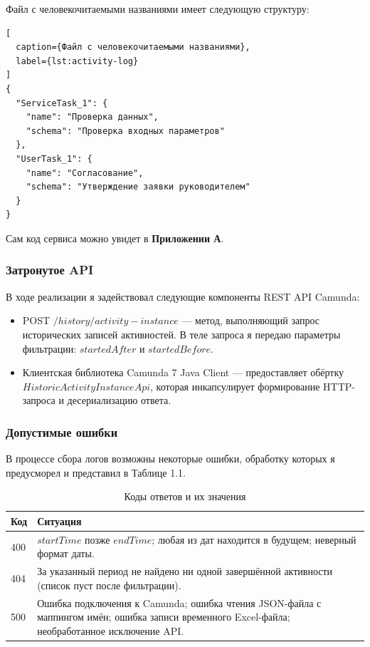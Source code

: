 Файл с человекочитаемыми названиями имеет следующую структуру:

\begin{lstlisting}[
  caption={Файл с человекочитаемыми названиями},
  label={lst:activity-log}
]
{
  "ServiceTask_1": {
    "name": "Проверка данных",
    "schema": "Проверка входных параметров"
  },
  "UserTask_1": {
    "name": "Согласование",
    "schema": "Утверждение заявки руководителем"
  }
}
\end{lstlisting}
Сам код сервиса можно увидет в \textbf{Приложении А}.

\subsubsection{Затронутое API}

В ходе реализации я задействовал следующие компоненты REST API Camunda:
\begin{itemize}
\item POST $/history/activity-instance$ — метод, выполняющий запрос исторических записей активностей.
В теле запроса я передаю параметры фильтрации:
$startedAfter$ и $startedBefore$.

\item Клиентская библиотека Camunda 7 Java Client — предоставляет обёртку $HistoricActivityInstanceApi$,
которая инкапсулирует формирование HTTP-запроса и десериализацию ответа.
\end{itemize}

\subsubsection{Допустимые ошибки}

В процессе сбора логов возможны некоторые ошибки, 
обработку которых я предусморел и представил в Таблице 1.1. 

\begin{table}[H]
  \centering
  \caption{Коды ответов и их значения}
  \begin{tabular}{|p{3cm}|p{10cm}|}
    \hline
    \textbf{Код} & \textbf{Ситуация} \\
    \hline
    400 & $startTime$ позже $endTime$; любая из дат находится в будущем; неверный формат даты. \\
    \hline
    404 & За указанный период не найдено ни одной завершённой активности (список пуст после фильтрации). \\
    \hline
    500 & Ошибка подключения к Camunda; ошибка чтения JSON-файла с маппингом имён; ошибка записи временного Excel-файла; необработанное исключение API. \\
    \hline
  \end{tabular}
\end{table}

